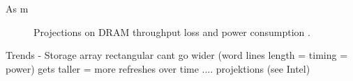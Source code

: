 As m

\begin{figure}[t]
    \centering
    \caption{Projections on DRAM throughput loss and power consumption \cite{raidr}.}
    \label{fig:dram_data_proj}
\end{figure}


Trends - Storage array rectangular
            cant go wider (word lines length = timing = power)
            gets taller = more refreshes
            over time .... projektions (see Intel)
